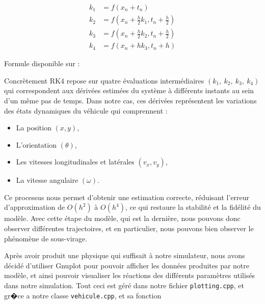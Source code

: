 \begin{align}
    k_1 &= f(x_n+t_n)\\
    k_2 &= f(x_n+ {\frac{h}{2}}k_1, t_n + {\frac{h}{2}})\\
    k_3 &= f(x_n+ {\frac{h}{2}}k_2, t_n + {\frac{h}{2}})\\
    k_4 &= f(x_n+ hk_3, t_n + h)
\end{align}
\begin{center}
    Formule disponible sur : \cite{RK4}
\end{center}
Concrètement RK4 repose sur quatre évaluations intermédiaires $(k_1, \ k_2, \ k_3, \ k_4)$ qui correspondent aux
dérivées estimées du système à différents instants au sein d'un même pas de temps. Dans notre cas, ces dérivées
représentent les variations des états dynamiques du véhicule qui comprennent :

\begin{itemize}
    \item La position $(x,y)$,
    \item L'orientation $(\theta)$,
    \item Les vitesses longitudinales et latérales $(v_x, v_y)$,
    \item La vitesse angulaire $(\omega)$.
\end{itemize}

Ce processus nous permet d'obtenir une estimation correcte, réduisant l'erreur d'approximation de $O(h^2)$ à $O(h^4)$,
ce qui restaure la stabilité et la fidélité du modèle. Avec cette étape du modèle, qui est la dernière, nous pouvons
donc observer différentes trajectoires, et en particulier, nous pouvons bien observer le phénomène de sous-virage.

Après avoir produit une physique qui suffisait à notre simulateur, nous avons décidé d'utiliser Gnuplot pour pouvoir
afficher  les données produites par notre modèle, et ainsi pouvoir visualiser les réactions des différents paramètres
utilisés dans notre simulation.
Tout ceci est géré dans notre fichier \texttt{plotting.cpp}, et gr�ce a notre classe \texttt{vehicule.cpp}, et sa
fonction

